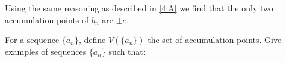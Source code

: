 \documentclass[week=4]{homework}
\begin{document}
\begin{questions}
\begin{parts}
        	Using the same reasoning as described in \ref{4:A} we find that the only two accumulation points of $b_n$ are $\pm e$.
        \end{parts}
        
        \question
        For a sequence $\{a_n \} $, define $V(\{a_n \})$ the set of accumulation points. Give examples of sequences $\{a_n \}$ such that:
        
     \end{questions}
\end{document}
